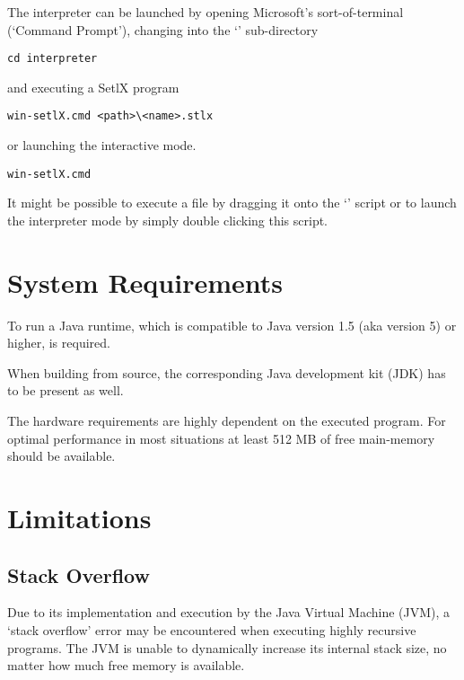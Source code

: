 The \setlX{} interpreter can be launched by opening Microsoft's sort-of-terminal (`Command Prompt'), changing into the `' sub-directory

\begin{lstlisting}[frame=none,numbers=none]
cd interpreter
\end{lstlisting}

and executing a SetlX program

\begin{lstlisting}[frame=none,numbers=none]
win-setlX.cmd <path>\<name>.stlx
\end{lstlisting}

or launching the interactive mode.

\begin{lstlisting}[frame=none,numbers=none]
win-setlX.cmd
\end{lstlisting}

It might be possible to execute a \SetlX{} file by dragging it onto the `' script or to launch the interpreter mode by simply double clicking this script.

\section{System Requirements}

To run \setlX{} a Java runtime, which is compatible to Java version 1.5 (aka version 5) or higher, is required.

When building from source, the corresponding Java development kit (JDK) has to be present as well.

The hardware requirements are highly dependent on the executed \SetlX{} program. For optimal performance in most situations at least 512 MB of free main-memory should be available.

\section{Limitations}

\subsection{Stack Overflow}

Due to its implementation and execution by the Java Virtual Machine (JVM), a `stack overflow' error may be encountered when executing highly recursive \SetlX{} programs. The JVM is unable to dynamically increase its internal stack size, no matter how much free memory is available.

